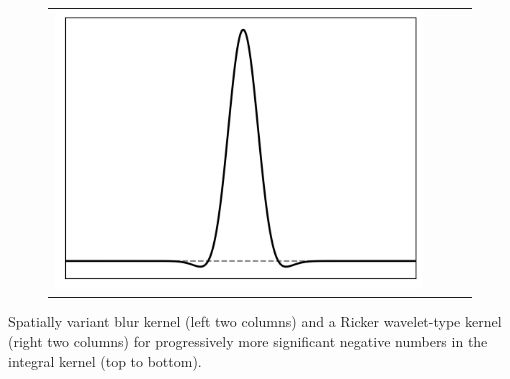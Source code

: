 \documentclass[10pt,final,xcolor=dvipsnames]{beamer}
\newcommand{\Aker}{\Phi}
\begin{document}
\begin{frame}
\begin{figure}
{\begin{tabular}{cccc}
	    \includegraphics[scale=0.2]{localpsf_revised_figures/ricker_1d_a=0.249.png} 
	  \end{tabular}
	}
  \end{figure}
  
  \begin{center}
    Spatially variant blur kernel (left two columns) and a Ricker
    wavelet-type kernel (right two columns) for progressively more
    significant negative numbers in the integral kernel (top to
    bottom).
  \end{center}

\end{frame}
\end{document}
